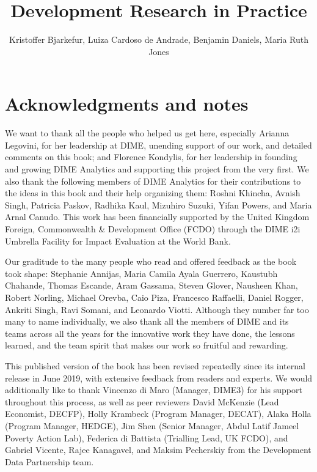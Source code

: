 \documentclass[]{tufte-book}
\title{Development Research in Practice}
\author{Kristoffer Bjarkefur, Luiza Cardoso de Andrade, Benjamin Daniels, Maria
Ruth Jones}
\date{}
\begin{document}
\maketitle




\hypertarget{acknowledgments-and-notes}{%
\chapter*{Acknowledgments and notes}\label{acknowledgments-and-notes}}

We want to thank all the people who helped us get here, especially
Arianna Legovini, for her leadership at DIME, unending support of our
work, and detailed comments on this book; and Florence Kondylis, for her
leadership in founding and growing DIME Analytics and supporting this
project from the very first. We also thank the following members of DIME
Analytics for their contributions to the ideas in this book and their
help organizing them: Roshni Khincha, Avnish Singh, Patricia Paskov,
Radhika Kaul, Mizuhiro Suzuki, Yifan Powers, and Maria Arnal Canudo.
This work has been financially supported by the United Kingdom Foreign,
Commonwealth \& Development Office (FCDO) through the DIME i2i Umbrella
Facility for Impact Evaluation at the World Bank.

Our graditude to the many people who read and offered feedback as the
book took shape: Stephanie Annijas, Maria Camila Ayala Guerrero,
Kaustubh Chahande, Thomas Escande, Aram Gassama, Steven Glover, Nausheen
Khan, Robert Norling, Michael Orevba, Caio Piza, Francesco Raffaelli,
Daniel Rogger, Ankriti Singh, Ravi Somani, and Leonardo Viotti. Although
they number far too many to name individually, we also thank all the
members of DIME and its teams across all the years for the innovative
work they have done, the lessons learned, and the team spirit that makes
our work so fruitful and rewarding.

This published version of the book has been revised repeatedly since its
internal release in June 2019, with extensive feedback from readers and
experts. We would additionally like to thank Vincenzo di Maro (Manager,
DIME3) for his support throughout this process, as well as peer
reviewers David McKenzie (Lead Economist, DECFP), Holly Krambeck
(Program Manager, DECAT), Alaka Holla (Program Manager, HEDGE), Jim Shen
(Senior Manager, Abdul Latif Jameel Poverty Action Lab), Federica di
Battista (Trialling Lead, UK FCDO), and Gabriel Vicente, Rajee
Kanagavel, and Maksim Pecherskiy from the Development Data Partnership
team.
\end{document}
